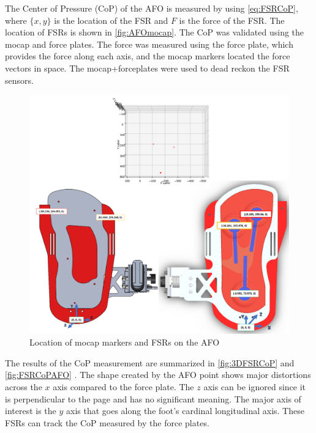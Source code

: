 The Center of Pressure (CoP) of the AFO is measured by using \autoref{eq:FSRCoP}, where $\{x,y\}$ is the location of the FSR and $F$ is the force of the FSR. The location of FSRs is shown in \autoref{fig:AFOmocap}. The CoP was validated using the mocap and force plates. The force was measured using the force plate, which provides the force along each axis, and the mocap markers located the force vectors in space. The mocap+forceplates were used to dead reckon the FSR sensors. 




 \begin{figure}[h]
    \ContinuedFloat
           \captionsetup{justification=centering}
           \centerline{ \includegraphics[scale=0.22]{images/mech_design/Mocap_Layout_2.png}}
            \caption[AFO Mocap Markers]{Location of mocap markers and FSRs on the AFO \cite{Michaels2020}}
            \label{fig:AFOmocap}
    \end{figure}


The results of the CoP measurement are summarized in \autoref{fig:3DFSRCoP} and \autoref{fig:FSRCoPAFO} . The shape created by the AFO point shows major distortions across the $x$ axis compared to the force plate. The $z$ axis can be ignored since it is perpendicular to the page and has no significant meaning. The major axis of interest is the $y$ axis that goes along the foot's cardinal longitudinal axis. These FSRs can track the CoP measured by the force plates. 


